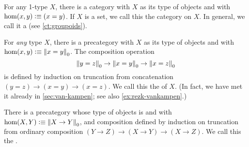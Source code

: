 \begin{eg}\label{ct:discrete}
  For any 1-type $X$, there is a category with $X$ as its type of objects and with $\hom(x,y) \vcentcolon\equiv (x=y)$.
  If $X$ is a set, we call this the  category on $X$.
  In general, we call it a  (see \autoref{ct:groupoids}).
\end{eg}

\begin{eg}\label{ct:fundgpd}
  For \emph{any} type $X$, there is a precategory with $X$ as its type of objects and with $\hom(x,y) \vcentcolon\equiv \mathopen{}\left\Vert x=y\right\Vert_{0}\mathclose{}$.
  The composition operation
  \[ \mathopen{}\left\Vert y=z\right\Vert_{0}\mathclose{} \to \mathopen{}\left\Vert x=y\right\Vert_{0}\mathclose{} \to \mathopen{}\left\Vert x=z\right\Vert_{0}\mathclose{} \]
  is defined by induction on truncation from concatenation $(y=z)\to(x=y)\to(x=z)$.
  We call this the  of $X$.
  (In fact, we have met it already in \autoref{sec:van-kampen}; see also \autoref{ex:rezk-vankampen}.)
\end{eg}

\begin{eg}\label{ct:hoprecat}
  There is a precategory whose type of objects is \type and with $\hom(X,Y) \vcentcolon\equiv \mathopen{}\left\Vert X\to Y\right\Vert_{0}\mathclose{}$, and composition defined by induction on truncation from ordinary composition $(Y\to Z) \to (X\to Y) \to (X\to Z)$.
  We call this the .
\end{eg}

